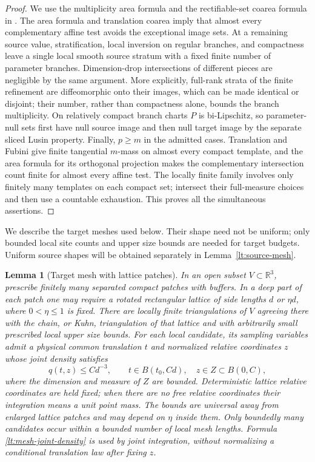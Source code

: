 \documentclass[11pt]{article}
\numberwithin{equation}{section}
\newtheorem{lemma}[theorem]{Lemma}
\theoremstyle{definition}
\theoremstyle{remark}
\newcommand{\R}{\mathbb R}
\begin{document}
\begin{proof}
We use the multiplicity area formula and the rectifiable-set coarea
formula in \cite[Chapter~2, Section~3, and Chapter~3, Section~2]{Simon2014Draft}.
The area formula and translation coarea imply that almost every
complementary affine test avoids the exceptional image sets.  At a
remaining source value, stratification, local inversion on regular
branches, and compactness leave a single local smooth source stratum
with a fixed finite number of parameter branches.  Dimension-drop
intersections of different pieces are negligible by the same argument.
More explicitly, full-rank strata of the finite refinement are
diffeomorphic onto their images, which can be made identical or
disjoint; their number, rather than compactness alone, bounds the
branch multiplicity. On relatively compact branch charts $P$ is
bi-Lipschitz, so parameter-null sets first have null source image and
then null target image by the separate sliced Lusin property.
Finally, $p\ge m$ in the admitted cases. Translation and Fubini give
finite tangential $m$-mass on almost every compact template, and the
area formula for its orthogonal projection makes the complementary
intersection count finite for almost every affine test.
The locally finite family involves only finitely many templates on
each compact set; intersect their full-measure choices and then use
a countable exhaustion.  This proves all the simultaneous assertions.
\end{proof}

We describe the target meshes used below.  Their shape need not be
uniform; only bounded local site counts and upper size bounds are
needed for target budgets.  Uniform source shapes will be obtained
separately in Lemma~\ref{lt:source-mesh}.

\begin{lemma}[Target mesh with lattice patches]
\label{lt:target-mesh}
In an open subset $V\subset\R^3$, prescribe finitely many separated
compact patches with buffers.  In a deep part of each patch one may
require a rotated rectangular lattice of side lengths $d$ or
$\eta d$, where $0<\eta\leq1$ is fixed.  There are locally finite
triangulations of $V$ agreeing there with the chain, or Kuhn,
triangulation of that lattice and with arbitrarily small prescribed
local upper size bounds.  For each local candidate, its sampling variables admit a physical
common translation $t$ and normalized relative coordinates $z$ whose
\emph{joint} density satisfies
\begin{equation}
 q(t,z)\leq Cd^{-3},\qquad
 t\in B(t_0,Cd),\quad z\in Z\subset B(0,C),
 \label{lt:mesh-joint-density}
\end{equation}
where the dimension and measure of $Z$ are bounded.  Deterministic
lattice relative coordinates are held fixed; when there are no free
relative coordinates their integration means a unit point mass.
The bounds are universal away from enlarged lattice patches and may
depend on $\eta$ inside them.  Only boundedly many candidates occur
within a bounded number of local mesh lengths.  Formula
\eqref{lt:mesh-joint-density} is used by joint integration, without
normalizing a conditional translation law after fixing $z$.
\end{lemma}
\end{document}
